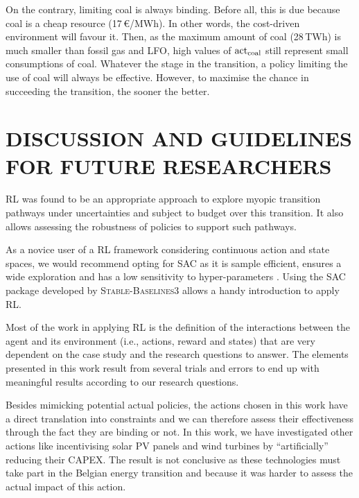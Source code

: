 \documentclass[11pt,twoside,a4paper,english]{article}
\def\ie{i.e., }
\begin{document}
On the contrary, limiting coal is always binding. Before all, this is due because coal is a cheap resource (17\,€/MWh). In other words, the cost-driven environment will favour it. Then, as the maximum amount of coal (28\,TWh) is much smaller than fossil gas and \gls{LFO}, high values of $\mathrm{act}\textsubscript{coal}$ still represent small consumptions of coal. Whatever the stage in the transition, a policy limiting the use of coal will always be effective. However, to maximise the chance in succeeding the transition, the sooner the better.

\newpage
\section{DISCUSSION AND GUIDELINES FOR FUTURE RESEARCHERS}
\label{sec:discussions}

\acrfull{RL} was found to be an appropriate approach to explore myopic transition pathways under uncertainties and subject to  budget over this transition. It also allows assessing the robustness of policies to support such pathways. 

As a novice user of a \gls{RL} framework considering continuous action and state spaces, we would recommend opting for \gls{SAC} as it is sample efficient, ensures a wide exploration and has a low sensitivity to hyper-parameters \cite{haarnoja2018soft}. Using the \gls{SAC} package developed by \textsc{Stable-Baselines3} allows a handy introduction to apply \gls{RL}. 

Most of the work in applying \gls{RL} is the definition of the interactions between the agent and its environment (\ie actions, reward and states) that are very dependent on the case study and the research questions to answer. The elements presented in this work result from several trials and errors to end up with meaningful results according to our research questions.

Besides mimicking potential actual policies, the actions chosen in this work have a direct translation into constraints and we can therefore assess their effectiveness through the fact they are binding or not. In this work, we have investigated other actions like incentivising solar \gls{PV} panels and wind turbines by ``artificially'' reducing their \gls{CAPEX}. The result is not conclusive as these technologies must take part in the Belgian energy transition and because it was harder to assess the actual impact of this action. 
\end{document}
